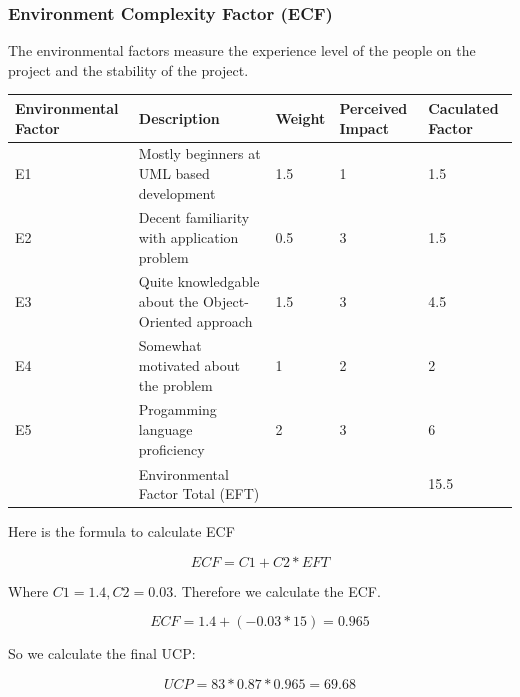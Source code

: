 \documentclass[letterpaper,english, 12pt]{scrreprt}
\begin{document}
\subsubsection{Environment Complexity Factor (ECF)}

The environmental factors measure the experience level of the people on the project and the stability of the project. 

\begin{center}
        \begin{tabular}{|C{3cm}|C{5cm}|C{1.5cm}|C{2cm}|C{2cm}|}
                \hline
                        Environmental Factor & Description & Weight & Perceived Impact & Caculated Factor \\
                \hline
                        E1 & Mostly beginners at UML based development & 1.5 & 1 & 1.5 \\
                \hline
                        E2 & Decent familiarity with application problem& 0.5 & 3 & 1.5\\
                \hline
                        E3 & Quite knowledgable about the Object-Oriented approach & 1.5 & 3 & 4.5 \\
                \hline
                        E4 & Somewhat motivated about the problem & 1 & 2 & 2 \\
                \hline
                        E5 & Progamming language proficiency & 2 & 3 & 6 \\
                \hline
                           & Environmental Factor Total (EFT) & & & 15.5 \\
                \hline
        \end{tabular}
\end{center}

Here is the formula to calculate ECF

\begin{equation}
ECF = C1 + C2 * EFT
\end{equation}

Where $C1 = 1.4, C2 = 0.03$.  Therefore we calculate the ECF.

\begin{equation}
ECF = 1.4 + (-0.03*15)=0.965
\end{equation}

So we calculate the final UCP:

\begin{equation}
UCP = 83*0.87*0.965 = 69.68
\end{equation}
\end{document}
